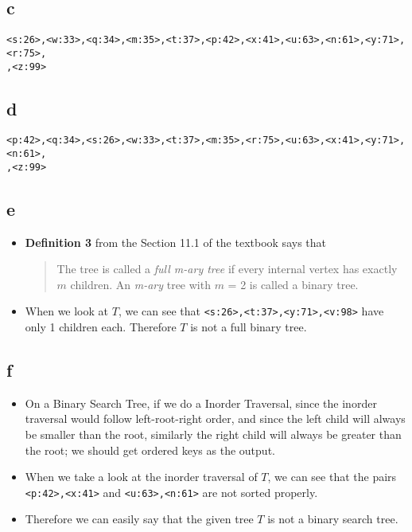 \documentclass[11pt]{article}
\begin{document}
\subsection*{c}
\texttt{<s:26>,<w:33>,<q:34>,<m:35>,<t:37>,<p:42>,<x:41>,<u:63>,<n:61>,<y:71>,<r:75>,\\<v:98>,<z:99>}
\subsection*{d}
\texttt{<p:42>,<q:34>,<s:26>,<w:33>,<t:37>,<m:35>,<r:75>,<u:63>,<x:41>,<y:71>,<n:61>,\\<v:98>,<z:99>}
\subsection*{e}
\begin{itemize}
    \item  \textbf{Definition 3} from the Section 11.1 of the textbook says that 
    \begin{quote}
        The tree is called a \textit{full m-ary tree} if every internal vertex has exactly $m$ children. An \textit{m-ary} tree with $m$ = 2 is called a binary tree.
    \end{quote}
    \item When we look at $T$, we can see that \texttt{<s:26>,<t:37>,<y:71>,<v:98>} have only 1 children each. Therefore $T$ is not a full binary tree.
\end{itemize}

\subsection*{f}
\begin{itemize}
    \item On a Binary Search Tree, if we do a Inorder Traversal,  since the inorder traversal would follow left-root-right order, and since the left child will always be smaller than the root, similarly the right child will always be greater than the root; we should get ordered keys as the output.
    \item When we take a look at the inorder traversal of $T$, we can see that the pairs \texttt{<p:42>,<x:41>} and  \texttt{<u:63>,<n:61>} are not sorted properly. 
    \item Therefore we can easily say that the given tree $T$ is not a binary search tree.
\end{itemize}
\end{document}
